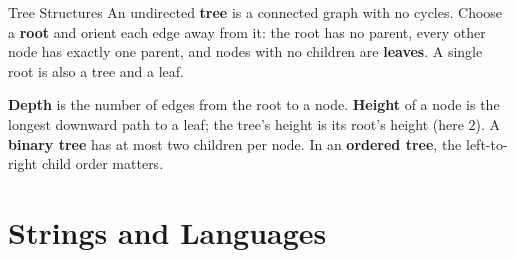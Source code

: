 \documentclass[10pt]{beamer}
\begin{document}
\begin{frame}{Tree Structures}
  \small
  An undirected \textbf{tree} is a connected graph with no cycles.
  Choose a \textbf{root} and orient each edge away from it: the root has
  no parent, every other node has exactly one parent, and nodes with no
  children are \textbf{leaves}. A single root is also a tree and a leaf.
  
  \begin{center}
  \end{center}
  \pause
  \textbf{Depth} is the number of edges from the root to a node.
  \textbf{Height} of a node is the longest downward path to a leaf;
  the tree's height is its root's height (here $2$).
  A \textbf{binary tree} has at most two children per node.
  In an \textbf{ordered tree}, the left-to-right child order matters.
\end{frame}

\section{Strings and Languages}
\end{document}
